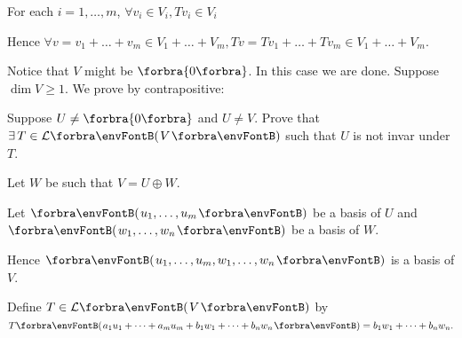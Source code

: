 \documentclass[a4paper, 11pt, UTF8]{article}
\begin{document}
\begin{large}
For each $i=1,\dots,m$, $\forall v_i\in V_i,Tv_i\in V_i$\par\quad
Hence $\forall v=v_1+\dots+v_m\in V_1+\dots+V_m,Tv=Tv_1+\dots+Tv_m\in V_1+\dots+V_m.$\PfEnd
\SepLine
%

\par\quad
Notice that $V$ might be $\zeroSubs$. In this case we are done. Suppose $\dim V\geqslant 1.$ We prove by contrapositive:\par\quad
{\tgsl Suppose $U\neq\zeroSubs$ and $U\neq V.$ Prove that $\exists\,T\in\Lm{V}$ such that $U$ is not invar under $T$.}\par\quad
Let $W$ be such that $V=U\oplus W.$\par\quad
Let $\Par{u_1,\dots,u_m}$ be a basis of $U$ and $\Par{w_1,\dots,w_n}$ be a basis of $W.$\par\quad
Hence $\Par{u_1,\dots,u_m,w_1,\dots,w_n}$ is a basis of $V$.\par\quad
Define $T\in\Lm{V}$ by $T\Par{a_1 u_1+\dots+a_m u_m+b_1 w_1+\dots+b_n w_n}=b_1 w_1+\dots+b_n w_n.$\PfEnd
\SepLine


\end{large}
\end{document}
